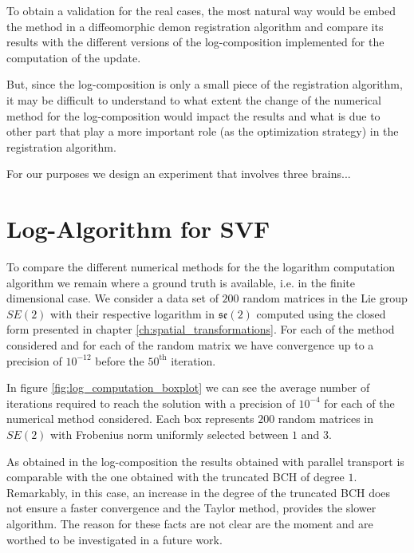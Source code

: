 To obtain a validation for the real cases, the most natural way would be embed the method in a diffeomorphic demon registration algorithm and compare its results with the different versions of the log-composition implemented for the computation of the update.

But, since the log-composition is only a small piece of the registration algorithm, it may be difficult to understand to what extent the change of the numerical method for the log-composition would impact the results and what is due to other part that play a more important role (as the optimization strategy) in the registration algorithm.

For our purposes we design an experiment that involves three brains... 


\section{Log-Algorithm for SVF}

To compare the different numerical methods for the the logarithm computation algorithm we remain where a ground truth is available, i.e. in the finite dimensional case. We consider a data set of $200$ random matrices in the Lie group $SE(2)$ with their respective logarithm in $\mathfrak{se}(2)$ computed using the closed form presented in chapter \ref{ch:spatial_transformations}. For each of the method considered and for each of the random matrix we have convergence up to a precision of $10^{-12}$ before the $50^{\text{th}}$ iteration.

In figure \ref{fig:log_computation_boxplot} we can see the average number of iterations required to reach the solution with a precision of $10^{-4}$ for each of the numerical method considered. Each box represents $200$ random matrices in $SE(2)$ with Frobenius norm uniformly selected between $1$ and $3$.

As obtained in the log-composition the results obtained with parallel transport is comparable with the one obtained with the truncated BCH of degree $1$. Remarkably, in this case, an increase in the degree of the truncated BCH does not ensure a faster convergence and the Taylor method, provides the slower algorithm. The reason for these facts are not clear are the moment and are worthed to be investigated in a future work.

